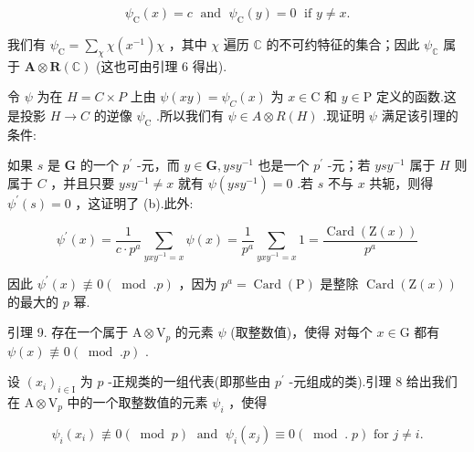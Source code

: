 \documentclass[10pt]{article}
\begin{document}
\[
{\psi }_{\mathrm{C}}\left( x\right)  = c\;\text{ and }\;{\psi }_{\mathrm{C}}\left( y\right)  = 0\;\text{ if }y \neq  x.
\]

我们有 \({\psi }_{\mathrm{C}} = \mathop{\sum }\limits_{\chi }\chi \left( {x}^{-1}\right) \chi\) ，其中 \(\chi\) 遍历 \(\mathbb{C}\) 的不可约特征的集合；因此 \({\psi }_{\mathbb{C}}\) 属于 \(\mathbf{A} \otimes  \mathbf{R}\left( \mathbb{C}\right)\) (这也可由引理 6 得出).

令 \(\psi\) 为在 \(H = C \times  P\) 上由 \(\psi \left( {xy}\right)  = {\psi }_{C}\left( x\right)\) 为 \(x \in  \mathrm{C}\) 和 \(y \in  \mathrm{P}\) 定义的函数.这是投影 \(H \rightarrow  C\) 的逆像 \({\psi }_{\mathrm{C}}\) .所以我们有 \(\psi  \in  A \otimes  R\left( H\right)\) .现证明 \(\psi\) 满足该引理的条件:

如果 \(s\) 是 \(\mathbf{G}\) 的一个 \({p}^{\prime }\) -元，而 \(y \in  \mathbf{G},{ys}{y}^{-1}\) 也是一个 \({p}^{\prime }\) -元；若 \({ys}{y}^{-1}\) 属于 \(H\) 则属于 \(C\) ，并且只要 \({ys}{y}^{-1} \neq  x\) 就有 \(\psi \left( {{ys}{y}^{-1}}\right)  = 0\) .若 \(s\) 不与 \(x\) 共轭，则得 \({\psi }^{\prime }\left( s\right)  = 0\) ，这证明了 (b).此外:

\[
{\psi }^{\prime }\left( x\right)  = \frac{1}{c \cdot  {p}^{a}}\mathop{\sum }\limits_{{{yx}{y}^{-1} = x}}\psi \left( x\right)  = \frac{1}{{p}^{a}}\mathop{\sum }\limits_{{{yx}{y}^{-1} = x}}1 = \frac{\operatorname{Card}\left( {\mathrm{Z}\left( x\right) }\right) }{{p}^{a}}
\]

因此 \({\psi }^{\prime }\left( x\right)  \text{ ≢ } 0\left( {\;\operatorname{mod}\;.p}\right)\) ，因为 \({p}^{a} = \operatorname{Card}\left( \mathrm{P}\right)\) 是整除 \(\operatorname{Card}\left( {\mathrm{Z}\left( x\right) }\right)\) 的最大的 \(p\) 幂.

引理 9. 存在一个属于 \(\mathrm{A} \otimes  {\mathrm{V}}_{p}\) 的元素 \(\psi\) (取整数值)，使得 对每个 \(x \in  \mathrm{G}\) 都有 \(\psi \left( x\right)  \text{ ≢ } 0\left( {{\;\operatorname{mod}\;.}p}\right)\) .

设 \({\left( {x}_{i}\right) }_{i \in  \mathrm{I}}\) 为 \(p\) -正规类的一组代表(即那些由 \({p}^{\prime }\) -元组成的类).引理 8 给出我们在 \(\mathrm{A} \otimes  {\mathrm{V}}_{p}\) 中的一个取整数值的元素 \({\psi }_{i}\) ，使得

\[
{\psi }_{i}\left( {x}_{i}\right)  \text{ ≢ } 0\left( {\;\operatorname{mod}\;p}\right) \;\text{ and }\;{\psi }_{i}\left( {x}_{j}\right)  \equiv  0\left( {\;\operatorname{mod}\;.\;p}\right) \text{ for }j \neq  i.
\]
\end{document}
